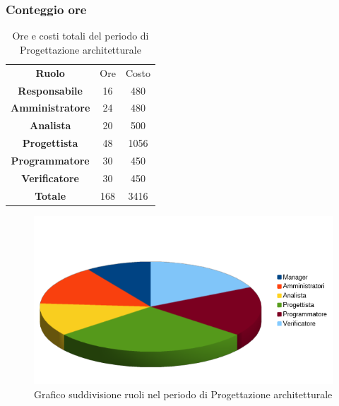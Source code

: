 \subsubsection{Conteggio ore}
\begin{table}[h!]
	\centering
	\renewcommand{\arraystretch}{2} 
	\begin{tabular}{| c c c|}
		\rowcolor{orange!50}
		\hline
		\multicolumn{3}{|c|}{\textbf{Suddivisione ruoli in ore}}\\
		\hline
		\textbf{Ruolo} 			& Ore 	& Costo\\
		\hline
		\textbf{Responsabile}	&16		&480\\
		\hline
		\textbf{Amministratore}	&24		&480\\
		\hline
		\textbf{Analista}		&20		&500\\
		\hline
		\textbf{Progettista}	&48		&1056\\
		\hline
		\textbf{Programmatore}	&30		&450\\
		\hline
		\textbf{Verificatore} 	&30		&450\\
		\hline
		\textbf{Totale} 		&168	&3416\\
		\hline 
	\end{tabular}
	\caption{Ore e costi totali del periodo di Progettazione architetturale}
\end{table}
		
\begin{figure}[h!]
	\centering
	\includegraphics[width=\textwidth]{preventivo/torta_seconda_parte.png}
	\caption{Grafico suddivisione ruoli nel periodo di Progettazione architetturale}
\end{figure}